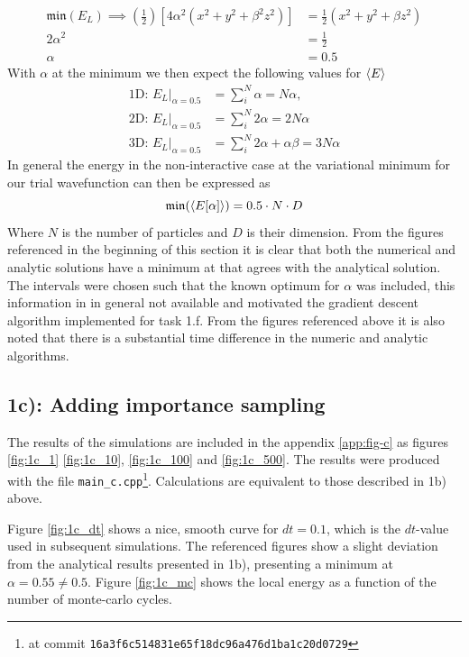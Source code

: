 \begin{align}
\mathfrak{min}(E_L)  \implies \left(\frac{1}{2}\right)[4\alpha^2 (x^2 + y^2 + \beta^2 z^2) ] &= \frac{1}{2} (x^2 + y^2 + \beta z^2) \\
 2 \alpha ^2  &= \frac{1}{2} \\
 \alpha &= 0.5
\end{align}
With $\alpha$ at the minimum we then expect the following values for $\langle E \rangle$
\begin{equation}
\begin{split}
\text{1D: }E_L |_{\alpha = 0.5} &= \sum_i^N \alpha = N \alpha,\\
\text{2D: }E_L|_{\alpha = 0.5} &= \sum_i^N  2\alpha = 2N \alpha \\
\text{3D: }E_L|_{\alpha = 0.5} &= \sum_i^N  2\alpha + \alpha \beta  = 3N\alpha
\end{split}
\end{equation}
In general the energy in the non-interactive case at the variational minimum for our trial wavefunction can then be expressed as 
\begin{equation}
\mathfrak{min}(\langle E[\alpha] \rangle) = 0.5 \cdot N \cdot D  
\end{equation}
Where $N$ is the number of particles and $D$ is their dimension. From the figures referenced in the beginning of this section it is clear that both the numerical and analytic solutions have a minimum at that  agrees with the analytical solution. The intervals  were chosen such that the known optimum for $\alpha$ was included, this information in in general not available and motivated the gradient descent algorithm implemented for task 1.f. From the figures referenced above it is also noted that there is a substantial time difference in the numeric and analytic algorithms. 

\subsection*{\textbf{1c):} Adding importance sampling}

The results of the simulations are included in the appendix \ref{app:fig-c} as figures \ref{fig:1c_1} \ref{fig:1c_10}, \ref{fig:1c_100} and \ref{fig:1c_500}. 
The results were produced with the file \lstinline{main_c.cpp}\footnote{at commit \lstinline{16a3f6c514831e65f18dc96a476d1ba1c20d0729}}. 
Calculations are equivalent to those described in 1b) above.

Figure \ref{fig:1c_dt} shows a nice, smooth curve for $dt = 0.1$, which is the $dt$-value used in subsequent simulations.
The referenced figures show a slight deviation from the analytical results presented in 1b), presenting a minimum at $\alpha = 0.55 \neq 0.5$. 
Figure \ref{fig:1c_mc} shows the local energy as a function of the number of monte-carlo cycles.

